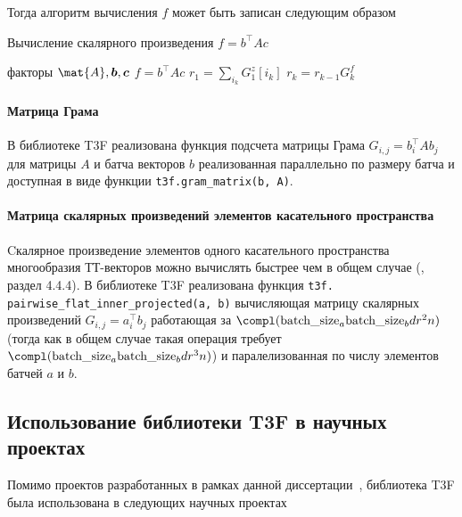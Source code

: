Тогда алгоритм вычисления $f$ может быть записан следующим образом

\begin{algorithm}[tb]
   \caption{Вычисление скалярного произведения $f = b^\intercal A c$}
   \label{alg:quadratic-form}
\begin{algorithmic}[1]
   \REQUIRE факторы $\mat{A}, \vec{b}, \vec{c}$
   \ENSURE $f = b^\intercal A c$
   \STATE $r_1 = \sum_{i_k} G_1^z[i_k]$
   \STATE $r_k = r_{k-1}G_k^f$
   \ENDFOR
\end{algorithmic}
\end{algorithm}

\paragraph{Матрица Грама}
В библиотеке T3F реализована функция подсчета матрицы Грама $G_{i,j} = b_i^\intercal A b_j$ для матрицы $A$ и батча векторов $b$ реализованная параллельно по размеру батча и доступная в виде функции \texttt{t3f.gram\_matrix(b, A)}. 

\paragraph{Матрица скалярных произведений элементов касательного пространства}
Cкалярное произведение элементов одного касательного пространства многообразия ТТ-векторов можно вычислять быстрее чем в общем случае (\cite{Steinlechner2016}, раздел 4.4.4). В библиотеке T3F реализована функция \texttt{t3f. pairwise\_flat\_inner\_projected(a, b)} вычисляющая матрицу скалярных произведений $G_{i,j} = a_i^\intercal b_j$ работающая за $\compl(\text{batch\_size}_a \text{batch\_size}_b d r^2 n)$  (тогда как в общем случае такая операция требует $\compl(\text{batch\_size}_a \text{batch\_size}_b d r^3 n)$) и паралелизованная по числу элементов батчей $a$ и $b$.

\subsection{Использование библиотеки T3F в научных проектах}
Помимо проектов разработанных в рамках данной диссертации~\cite{tensor-net?,mrf?,exp machines?,quantum}, библиотека T3F была использована в следующих научных проектах
